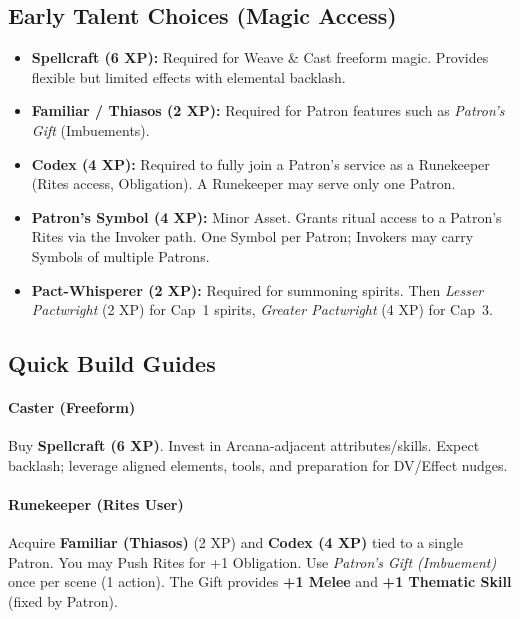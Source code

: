 \subsection{Early Talent Choices (Magic Access)}
\begin{itemize}
  \item \textbf{Spellcraft (6 XP):} Required for Weave \& Cast freeform magic. Provides flexible but limited effects with elemental backlash.
  \item \textbf{Familiar / Thiasos (2 XP):} Required for Patron features such as \emph{Patron's Gift} (Imbuements).
  \item \textbf{Codex (4 XP):} Required to fully join a Patron's service as a Runekeeper (Rites access, Obligation). A Runekeeper may serve only one Patron.
  \item \textbf{Patron's Symbol (4 XP):} Minor Asset. Grants ritual access to a Patron's Rites via the Invoker path. One Symbol per Patron; Invokers may carry Symbols of multiple Patrons.
  \item \textbf{Pact-Whisperer (2 XP):} Required for summoning spirits. Then \textit{Lesser Pactwright} (2 XP) for Cap~1 spirits, \textit{Greater Pactwright} (4 XP) for Cap~3.
\end{itemize}

\subsection{Quick Build Guides}

\paragraph{Caster (Freeform)}
Buy \textbf{Spellcraft (6 XP)}. Invest in Arcana‑adjacent attributes/skills. Expect backlash; leverage aligned elements, tools, and preparation for DV/Effect nudges.

\paragraph{Runekeeper (Rites User)}
Acquire \textbf{Familiar (Thiasos)} (2 XP) and \textbf{Codex (4 XP)} tied to a single Patron. You may Push Rites for +1 Obligation. Use \emph{Patron's Gift (Imbuement)} once per scene (1 action). The Gift provides \textbf{+1 Melee} and \textbf{+1 Thematic Skill} (fixed by Patron).

